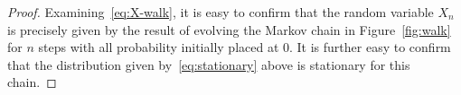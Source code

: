   \begin{proof}  
   
    Examining~\eqref{eq:X-walk}, it is easy to confirm that 
    the random variable $X_n$ is precisely given by 
    the result of evolving the Markov chain in Figure~\ref{fig:walk} for $n$ steps 
    with all probability initially placed at 0. 
    It is further easy to confirm that the distribution given by~\eqref{eq:stationary} above is stationary for this chain.




\end{proof}
